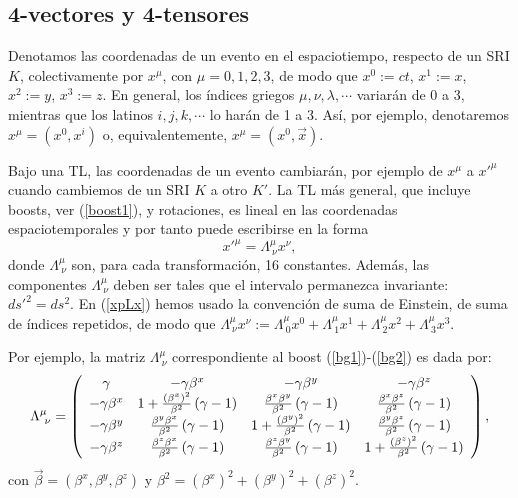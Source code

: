 \subsection{4-vectores y 4-tensores}

Denotamos las coordenadas de un evento en el espaciotiempo,
respecto de un SRI $K$, colectivamente por $x^\mu$, con $\mu=0,1,2,3$, de modo que $x^0:=ct$, $x^1:=x$, $x^2:=y$, $x^3:=z$. En general, los índices griegos $\mu,\nu,\lambda,\cdots$ variarán de 0 a 3, mientras que los latinos
$i,j,k,\cdots$ lo harán de 1 a 3. Así, por ejemplo, denotaremos
$x^\mu=(x^0,x^i)$ o, equivalentemente, $x^\mu=(x^0,\vec{x})$.

Bajo una TL, las coordenadas de un evento cambiarán, por ejemplo de $x^\mu$ a
$x'^\mu$ cuando cambiemos de un SRI $K$ a otro $K'$. La TL más general, que
incluye boosts, ver (\ref{boost1}), y rotaciones, es lineal en las coordenadas
espaciotemporales y por tanto puede escribirse en la forma
\begin{equation}\label{xpLx}
x'^\mu=\Lambda^\mu_{\ \nu}x^\nu ,
\end{equation}
donde $\Lambda^\mu_{\ \nu}$ son, para cada transformación, 16 constantes. Además, las componentes $\Lambda^\mu_{\ \nu}$ deben ser tales que el intervalo permanezca invariante: $ds'^2=ds^2$.
En (\ref{xpLx}) hemos usado la convención de suma de Einstein, de suma de
índices repetidos, de modo que $\Lambda^\mu_{\
\nu}x^\nu:=\Lambda^\mu_{\ 0}x^0+ \Lambda^\mu_{\ 1}x^1+ \Lambda^\mu_{\ 2}x^2+\Lambda^\mu_{\ 3}x^3$.

Por ejemplo, la matriz $\Lambda^\mu_{\ \nu}$ correspondiente al boost (\ref{bg1})-(\ref{bg2}) es dada por:
\begin{equation}
\Lambda^\mu_{\ \nu}=\left(
\begin{array}
[c]{cccc}
\gamma & -\gamma\beta^x & -\gamma\beta^y & -\gamma\beta^z\\
-\gamma\beta^x & 1+\frac{(\beta^x)^2}{\beta^2}\left(\gamma-1\right)  &
\frac{\beta^x\beta^y}{\beta^2}\left(\gamma-1\right)  & \frac{\beta^x\beta^z}{\beta^2}\left(\gamma-1\right) \\
-\gamma\beta^y & \frac{\beta^y\beta^x}{\beta^2}\left(\gamma-1\right)
& 1+\frac{(\beta^y)^2}{\beta^2}\left(\gamma-1\right)  & \frac{\beta
^y\beta^z}{\beta^2}\left(  \gamma-1\right) \\
-\gamma\beta^z & \frac{\beta^z\beta^x}{\beta^2}\left(\gamma-1\right)
& \frac{\beta^z\beta^y}{\beta^2}\left(\gamma-1\right)  & 1+\frac{(\beta^z)^2}{\beta^2}\left(\gamma-1\right)
\end{array}
\right), \label{boostgen}
\end{equation}
con $\vec\beta=(\beta^x,\beta^y,\beta^z)$ y $\beta^2=(\beta^x)^2+(\beta^y)^2+(\beta^z)^2$.

